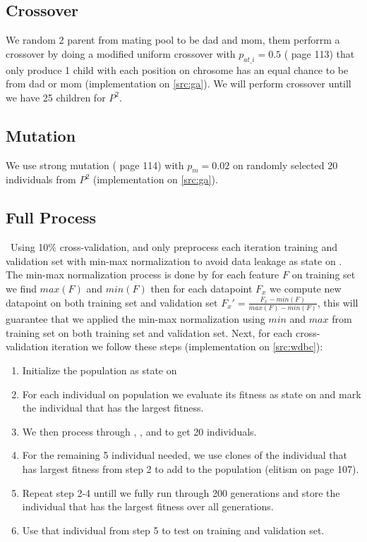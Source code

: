 \documentclass{article}
\begin{document}
\subsection*{Crossover}\label{mating}
We random 2 parent from mating pool to be dad and mom, them perforrm a crossover by doing a modified 
uniform crossover with $p_{at\_i} = 0.5$ (\cite{sansanee} page 113) that only produce 1 child with each position on chrosome 
has an equal chance to be from dad or mom (implementation on \ref{src:ga}). We will perform crossover untill we have 25 children for
$P^2$.

\subsection*{Mutation}\label{mutate}
We use strong mutation (\cite{sansanee} page 114) with $p_m = 0.02$ on randomly selected 20 individuals from $P^2$ 
(implementation on \ref{src:ga}).

\subsection*{Full Process}\
Using 10\% cross-validation, and only preprocess each iteration training and validation set with min-max normalization 
to avoid data leakage as state on \cite{dataleak}. The min-max normalization process is done by for each feature $F$ on training set
we find $max(F)$ and $min(F)$ then for each datapoint $F_x$ we compute new datapoint on both training set and 
validation set $F_x' = \frac{F_x - min(F)}{max(F) - min(F)}$, this will guarantee that we applied the min-max normalization using $min$
and $max$ from training set on both training set and validation set. Next, for each cross-validation iteration we follow these steps
(implementation on \ref{src:wdbc}):
\begin{enumerate}
    \item Initialize the population as state on 
    \item For each individual on population we evaluate its fitness as state on  and mark the individual that 
    has the largest fitness.
    \item We then process through , , and  to get 20 individuals.
    \item For the remaining 5 individual needed, we use clones of the individual that has largest fitness from step 2 to add to the
    population (elitism \cite{sansanee} on page 107).
    \item Repeat step 2-4 untill we fully run through 200 generations and store the individual that has the largest fitness over all 
    generations.
    \item Use that individual from step 5 to test on training and validation set.
\end{enumerate}
\end{document}
